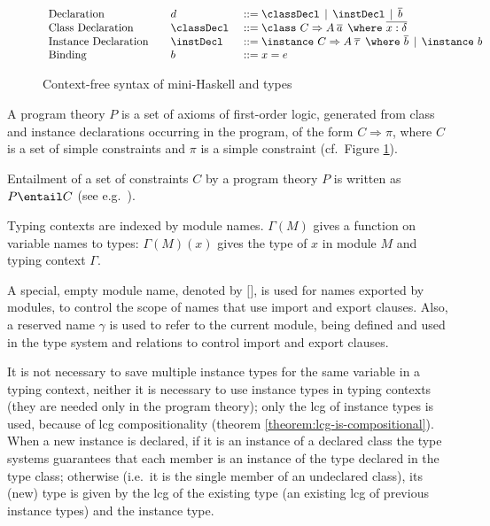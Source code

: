 \begin{figure}
\[\begin{array}[c]{llll}
\textrm{Declaration}        &         & d              & ::= \classDecl \,\mid\, \instDecl \,\mid\, \overline{b}\\
\textrm{Class Declaration}  &         & \classDecl\    & ::= \class\ C \Rightarrow A\: \overline{a}\:\: \where\ \overline{x:\delta}\\
\textrm{Instance Declaration} &       & \instDecl\     & ::= \instance\ C \Rightarrow A\: \overline{\tau}\:\: \where\ \overline{b} 
                                                             \,\mid\, \instance\ b\\
\textrm{Binding}              &       & b              & ::= x = e 
\end{array} \]
\caption{Context-free syntax of mini-Haskell and types}
\label{fig:mini-Haskell-context-free-syntax}
\end{figure}

A program theory $P$ is a set of axioms of first-order logic,
generated from class and instance declarations occurring in the
program, of the form $C \Rightarrow \pi$, where $C$ is a set of simple
constraints and $\pi$ is a simple constraint (cf.~Figure
\ref{fig:mini-Haskell-context-free-syntax}).

Entailment of a set of constraints $C$ by a program theory $P$ is
written as $P \entail C$ (see
e.g.~\cite{JBCS-Ambiguity-and-constrained-polymorphism}).

Typing contexts are indexed by module names. $\Gamma(M)$ gives a
function on variable names to types: $\Gamma(M)(x)$ gives the type of
$x$ in module $M$ and typing context $\Gamma$.
   
A special, empty module name, denoted by $\texttt{[]}$, is used for
names exported by modules, to control the scope of names that use
import and export clauses. Also, a reserved name $\gamma$ is used to
refer to the current module, being defined and used in the type system
and relations to control import and export clauses.

It is not necessary to save multiple instance types for the same
variable in a typing context, neither it is necessary to use instance
types in typing contexts (they are needed only in the program theory);
only the lcg of instance types is used, because of lcg
compositionality (theorem \ref{theorem:lcg-is-compositional}). When a
new instance is declared, if it is an instance of a declared class the
type systems guarantees that each member is an instance of the type
declared in the type class; otherwise (i.e.~it is the single member of
an undeclared class), its (new) type is given by the lcg of the
existing type (an existing lcg of previous instance types) and the
instance type.


